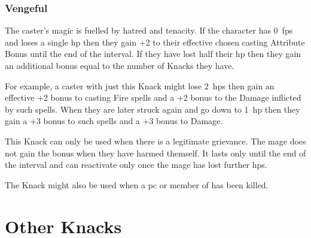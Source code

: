 \begin{multicols}{2}

\subsubsection{Vengeful}

The caster's magic is fuelled by hatred and tenacity.
If the character has 0~\glspl{fp} and loses a single \gls{hp} then they gain +2 to their effective chosen casting Attribute Bonus until the end of the \gls{interval}.
If they have lost half their \gls{hp} then they gain an additional bonus equal to the number of Knacks they have.

For example, a caster with just this Knack might lose 2~\glspl{hp} then gain an effective +2 bonus to casting Fire spells and a +2 bonus to the Damage inflicted by such spells.
When they are later struck again and go down to 1~\gls{hp} then they gain a +3 bonus to such spells and a +3 bonus to Damage.

This Knack can only be used when there is a legitimate grievance.
The mage does not gain the bonus when they have harmed themself.
It lasts only until the end of the \gls{interval} and can reactivate only once the mage has lost further \glspl{hp}.

The Knack might also be used when a \gls{pc} or member of  has been killed.

\end{multicols}

\section{Other Knacks}


